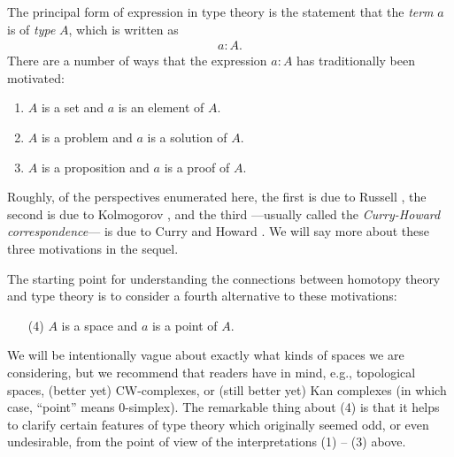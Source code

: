 \documentclass{amsart}
\theoremstyle{definition}
\theoremstyle{remark}
\numberwithin{equation}{section}
\begin{document}
The principal form of expression in type theory is the statement that
the \emph{term} $a$ is of
\emph{type} $A$, which is written as 
\begin{align*}
  a:A.
\end{align*}
There are a number of ways that the expression $a:A$ has traditionally
been motivated:
\begin{enumerate}
\item $A$ is a set and $a$ is an element of $A$.
\item $A$ is a problem and $a$ is a solution of $A$.
\item $A$ is a proposition and $a$ is a proof of $A$.
\end{enumerate}
Roughly, of the perspectives enumerated here,
the first is due to Russell \cite{Russell:1903wn}, the
second is due to Kolmogorov \cite{Kolmogoroff:1932wl}, and the third
---usually called the \emph{Curry-Howard correspondence}---
is due to Curry and Howard \cite{Howard:FTNC}.  We will say more about
these three motivations in the sequel.

The starting point for understanding the connections between homotopy
theory and type theory is to consider a fourth alternative to these
motivations:
\begin{enumerate}
\item[(4)] $A$ is a space and $a$ is a point of $A$.
\end{enumerate}
We will be intentionally vague about exactly what kinds of
spaces we are considering, but we recommend that readers have in mind,
e.g., topological spaces, (better yet) CW-complexes, or (still better yet)
Kan complexes (in which case, ``point'' means $0$-simplex).  The
remarkable thing about (4) is that it helps to clarify certain features of
type theory which originally seemed odd, or
even undesirable, from the point of view of the
interpretations (1) -- (3) above.  
\end{document}
